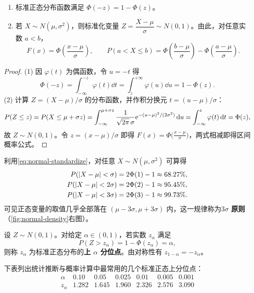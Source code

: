 \begin{proposition}[正态分布的标准化与对称性]
\label{prop:normal-standardize}
\begin{enumerate}
  \item 标准正态分布函数满足 $\Phi(-z)=1-\Phi(z)$。
  \item 若 $X\sim N(\mu,\sigma^2)$，则标准化变量 $Z=\dfrac{X-\mu}{\sigma}\sim N(0,1)$。由此，对任意实数 $a<b$，
  \begin{equation}
    F(x)=\Phi\left(\frac{x-\mu}{\sigma}\right),\qquad
    P(a<X\le b)=\Phi\left(\frac{b-\mu}{\sigma}\right)-\Phi\left(\frac{a-\mu}{\sigma}\right).
    \label{eq:normal-standardize}
  \end{equation}
\end{enumerate}
\end{proposition}
\begin{proof}
(1) 因 $\varphi(t)$ 为偶函数，令 $u=-t$ 得
\[
  \Phi(-z)=\int_{-\infty}^{-z}\varphi(t)\dd t=\int_{z}^{+\infty}\varphi(u)\dd u=1-\Phi(z).
\]
(2) 计算 $Z=(X-\mu)/\sigma$ 的分布函数，并作积分换元 $t=(u-\mu)/\sigma$：
\[
  P(Z\le z)=P(X\le\mu+\sigma z)
  =\int_{-\infty}^{\mu+\sigma z}\frac{1}{\sqrt{2\pi}\,\sigma}\mathrm{e}^{-(u-\mu)^2/(2\sigma^2)}\mathop{}\!\mathrm{d} u
  =\int_{-\infty}^{z}\varphi(t)\mathop{}\!\mathrm{d} t=\Phi(z),
\]
故 $Z\sim N(0,1)$。令 $z=(x-\mu)/\sigma$ 即得 $F(x)=\Phi\bigl(\frac{x-\mu}{\sigma}\bigr)$，两式相减即得区间概率公式。
\end{proof}

利用\eqref{eq:normal-standardize}，对任意 $X\sim N(\mu,\sigma^2)$ 可算得
\[
\begin{aligned}
  P(\lvert X-\mu\rvert<\sigma)&=2\Phi(1)-1\approx 68.27\%,\\
  P(\lvert X-\mu\rvert<2\sigma)&=2\Phi(2)-1\approx 95.45\%,\\
  P(\lvert X-\mu\rvert<3\sigma)&=2\Phi(3)-1\approx 99.73\%.
\end{aligned}
\]
可见正态变量的取值几乎全部落在 $(\mu-3\sigma,\mu+3\sigma)$ 内，这一规律称为\textbf{$3\sigma$ 原则}（\cref{fig:normal-density}右图）。

\begin{definition}
\label{def:normal-quantile}
设 $Z\sim N(0,1)$。对给定 $\alpha\in(0,1)$，若实数 $z_\alpha$ 满足
\[
  P(Z>z_\alpha)=1-\Phi(z_\alpha)=\alpha,
\]
则称 $z_\alpha$ 为标准正态分布的\textbf{上 $\alpha$ 分位点}。由对称性有 $z_{1-\alpha}=-z_\alpha$。
\end{definition}

下表列出统计推断与概率计算中最常用的几个标准正态上分位点：
\[
\begin{array}{c|cccccc}
  \alpha & 0.10 & 0.05 & 0.025 & 0.01 & 0.005 & 0.001 \\ \hline
  z_\alpha & 1.282 & 1.645 & 1.960 & 2.326 & 2.576 & 3.090
\end{array}
\]

